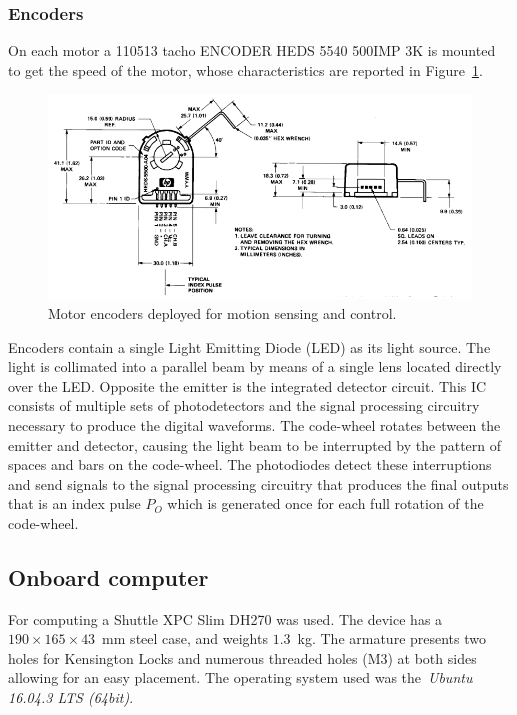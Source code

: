 \subsubsection{Encoders}
On each motor a 110513 tacho ENCODER HEDS 5540 500IMP 3K is mounted to get the speed of the motor, whose characteristics are reported in Figure~\ref{enc}.
\begin{figure}[htbp]
	\centering
	\includegraphics[width=\textwidth]{images/03-foundation/enc}
	\caption{Motor encoders deployed for motion sensing and control.}
	\label{enc} 
\end{figure}
Encoders contain a single Light Emitting Diode (LED) as its light source. The light is collimated into a parallel beam by means of a single lens located directly over the LED. Opposite the emitter is the integrated detector circuit. This IC consists of multiple sets of photodetectors and the signal processing circuitry necessary to produce the digital waveforms. The code-wheel rotates between the emitter and detector, causing the light beam to be interrupted by the pattern of spaces and bars on the code-wheel. The photodiodes detect these interruptions and send signals to the signal processing circuitry that produces the final outputs that is an index pulse $P_O$ which is generated once for each full rotation of the code-wheel.

\subsection{Onboard computer}
\label{onboard pc}
For computing a Shuttle XPC Slim DH270 was used. The device has a $190 \times 165 \times 43$~mm steel case, and weights $1.3$~kg.  The armature presents two holes for Kensington Locks and numerous threaded holes (M3) at both sides allowing for an easy placement. The operating system used was the~\textit{Ubuntu 16.04.3 LTS (64bit)}.

